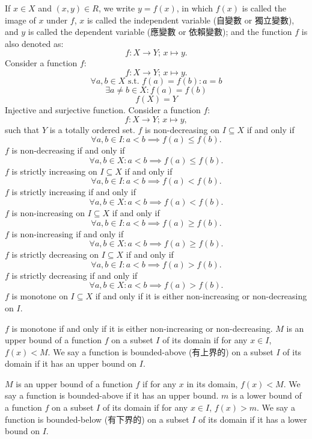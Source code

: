 \documentclass[a4paper,12pt]{report}
\begin{document}
If $x\in X$ and $(x, y) \in R$, we write $y = f(x)$, in which $f(x)$ is called the image of $x$ under $f$, $x$ is called the independent variable (自變數 or 獨立變數), and $y$ is called the dependent variable (應變數 or 依賴變數); and the function $f$ is also denoted as:
\[f \colon X \to Y;\, x \mapsto y.\]
Consider a function $f$:
\[f\colon X\to Y;\,x\mapsto y.\]
\[\forall a,b\in X\text{\ s.t.\ } f(a)=f(b)\colon a=b\]
\[\exists a\neq b\in X\colon f(a)=f(b)\]
\[f(X)=Y\]
Injective and surjective function.
Consider a function $f$:
\[f\colon X\to Y;\,x\mapsto y,\]
such that $Y$ is a totally ordered set.
$f$ is non-decreasing on $I\subseteq X$ if and only if
\[\forall a,b\in I\colon a<b\implies f(a)\leq f(b).\]
$f$ is non-decreasing if and only if
\[\forall a,b\in X\colon a<b\implies f(a)\leq f(b).\]
$f$ is strictly increasing on $I\subseteq X$ if and only if
\[\forall a,b\in I\colon a<b\implies f(a)<f(b).\]
$f$ is strictly increasing if and only if
\[\forall a,b\in X\colon a<b\implies f(a)<f(b).\]
$f$ is non-increasing on $I\subseteq X$ if and only if
\[\forall a,b\in I\colon a<b\implies f(a)\geq f(b).\]
$f$ is non-increasing if and only if
\[\forall a,b\in X\colon a<b\implies f(a)\geq f(b).\]
$f$ is strictly decreasing on $I\subseteq X$ if and only if
\[\forall a,b\in I\colon a<b\implies f(a)>f(b).\]
$f$ is strictly decreasing if and only if
\[\forall a,b\in X\colon a<b\implies f(a)>f(b).\]
$f$ is monotone on $I\subseteq X$ if and only if it is either non-increasing or non-decreasing on $I$.

$f$ is monotone if and only if it is either non-increasing or non-decreasing.
$M$ is an upper bound of a function $f$ on a subset $I$ of its domain if for any $x\in I$, $f(x)<M$. We say a function is bounded-above (有上界的) on a subset $I$ of its domain if it has an upper bound on $I$.

$M$ is an upper bound of a function $f$ if for any $x$ in its domain, $f(x)<M$. We say a function is bounded-above if it has an upper bound.
$m$ is a lower bound of a function $f$ on a subset $I$ of its domain if for any $x\in I$, $f(x)>m$. We say a function is bounded-below (有下界的) on a subset $I$ of its domain if it has a lower bound on $I$.
\end{document}
